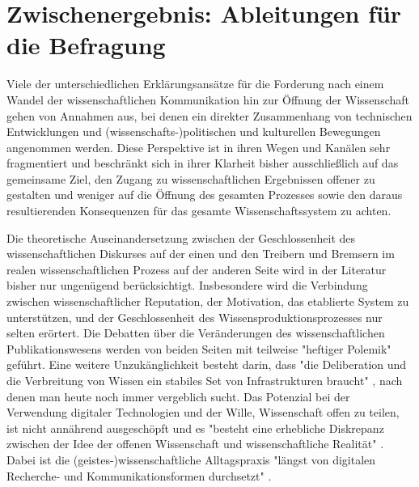 \section{Zwischenergebnis: Ableitungen für die Befragung}

Viele der unterschiedlichen Erklärungsansätze für die Forderung nach einem Wandel der wissenschaftlichen Kommunikation hin zur Öffnung der Wissenschaft gehen von Annahmen aus, bei denen ein direkter Zusammenhang von technischen Entwicklungen und (wissenschafts-)politischen und kulturellen Bewegungen angenommen werden. Diese Perspektive ist in ihren Wegen und Kanälen sehr fragmentiert und beschränkt sich in ihrer Klarheit bisher ausschließlich auf das gemeinsame Ziel, den Zugang zu wissenschaftlichen Ergebnissen offener zu gestalten und weniger auf die Öffnung des gesamten Prozesses sowie den daraus resultierenden Konsequenzen für das gesamte Wissenschaftssystem zu achten.

Die theoretische Auseinandersetzung zwischen der Geschlossenheit des wissenschaftlichen Diskurses auf der einen und den Treibern und Bremsern im realen wissenschaftlichen Prozess auf der anderen Seite wird in der Literatur bisher nur ungenügend berücksichtigt. Insbesondere wird die Verbindung zwischen wissenschaftlicher Reputation, der Motivation, das etablierte System zu unterstützen, und der Geschlossenheit des Wissensproduktionsprozesses nur selten erörtert. Die Debatten über die Veränderungen des wissenschaftlichen Publikationswesens werden von beiden Seiten mit teilweise "heftiger Polemik" \cite[:12]{Naeder_2010} geführt. Eine weitere Unzukänglichkeit besteht darin, dass "die Deliberation und die Verbreitung von Wissen ein stabiles Set von Infrastrukturen braucht" \cite{Kelty_2004}, nach denen man heute noch immer vergeblich sucht. Das Potenzial bei der Verwendung digitaler Technologien und der Wille, Wissenschaft offen zu teilen, ist nicht annährend ausgeschöpft und es "besteht eine erhebliche Diskrepanz zwischen der Idee der offenen Wissenschaft und wissenschaftliche Realität" \cite{Scheliga_2014}. Dabei ist die (geistes-)wissenschaftliche Alltagspraxis "längst von digitalen Recherche- und Kommunikationsformen durchsetzt" \cite{Hagner_2015}.

